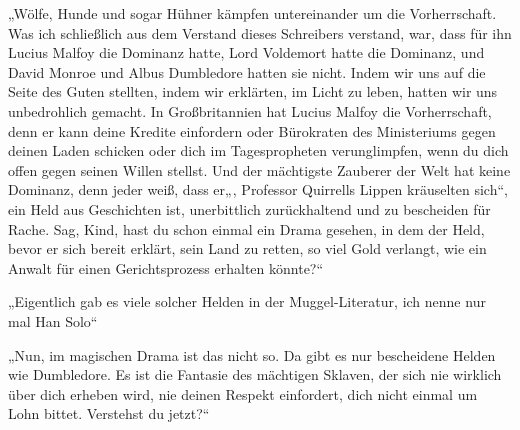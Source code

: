 „Wölfe, Hunde und sogar Hühner kämpfen untereinander um die Vorherrschaft. Was ich schließlich aus dem Verstand dieses Schreibers verstand, war, dass für ihn Lucius Malfoy die Dominanz hatte, Lord Voldemort hatte die Dominanz, und David Monroe und Albus Dumbledore hatten sie nicht. Indem wir uns auf die Seite des Guten stellten, indem wir erklärten, im Licht zu leben, hatten wir uns unbedrohlich gemacht. In Großbritannien hat Lucius Malfoy die Vorherrschaft, denn er kann deine Kredite einfordern oder Bürokraten des Ministeriums gegen deinen Laden schicken oder dich im Tagespropheten verunglimpfen, wenn du dich offen gegen seinen Willen stellst. Und der mächtigste Zauberer der Welt hat keine Dominanz, denn jeder weiß, dass er„, Professor Quirrells Lippen kräuselten sich“, ein Held aus Geschichten ist, unerbittlich zurückhaltend und zu bescheiden für Rache. Sag, Kind, hast du schon einmal ein Drama gesehen, in dem der Held, bevor er sich bereit erklärt, sein Land zu retten, so viel Gold verlangt, wie ein Anwalt für einen Gerichtsprozess erhalten könnte?“

„Eigentlich gab es viele solcher Helden in der Muggel-Literatur, ich nenne nur mal Han Solo“

„Nun, im magischen Drama ist das nicht so. Da gibt es nur bescheidene Helden wie Dumbledore. Es ist die Fantasie des mächtigen Sklaven, der sich nie wirklich über dich erheben wird, nie deinen Respekt einfordert, dich nicht einmal um Lohn bittet. Verstehst du jetzt?“

